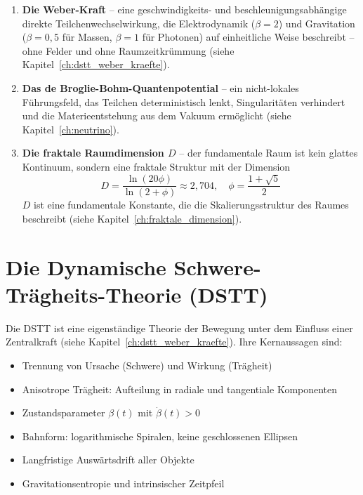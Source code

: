 \begin{enumerate}
    \item \textbf{Die Weber-Kraft} – eine geschwindigkeits- und beschleunigungsabhängige direkte Teilchenwechselwirkung, die Elektrodynamik (\( \beta = 2 \)) und Gravitation (\( \beta = 0,5 \) für Massen, \( \beta = 1 \) für Photonen) auf einheitliche Weise beschreibt – ohne Felder und ohne Raumzeitkrümmung (siehe Kapitel~\ref{ch:dstt_weber_kraefte}).
    
    \item \textbf{Das de Broglie-Bohm-Quantenpotential} – ein nicht-lokales Führungsfeld, das Teilchen deterministisch lenkt, Singularitäten verhindert und die Materieentstehung aus dem Vakuum ermöglicht (siehe Kapitel~\ref{ch:neutrino}).
    
    \item \textbf{Die fraktale Raumdimension \( D \)} – der fundamentale Raum ist kein glattes Kontinuum, sondern eine fraktale Struktur mit der Dimension
    \[
    D = \frac{\ln(20\phi)}{\ln(2 + \phi)} \approx 2,704, \quad \phi = \frac{1 + \sqrt{5}}{2}
    \]
    \( D \) ist eine fundamentale Konstante, die die Skalierungsstruktur des Raumes beschreibt (siehe Kapitel~\ref{ch:fraktale_dimension}).
\end{enumerate}

\section{Die Dynamische Schwere-Trägheits-Theorie (DSTT)}
\label{sec:dstt_zf}

Die DSTT ist eine eigenständige Theorie der Bewegung unter dem Einfluss einer Zentralkraft (siehe Kapitel~\ref{ch:dstt_weber_kraefte}). Ihre Kernaussagen sind:

\begin{itemize}
    \item Trennung von Ursache (Schwere) und Wirkung (Trägheit)
    \item Anisotrope Trägheit: Aufteilung in radiale und tangentiale Komponenten
    \item Zustandsparameter \( \beta(t) \) mit \( \dot{\beta}(t) > 0 \)
    \item Bahnform: logarithmische Spiralen, keine geschlossenen Ellipsen
    \item Langfristige Auswärtsdrift aller Objekte
    \item Gravitationsentropie und intrinsischer Zeitpfeil
\end{itemize}

